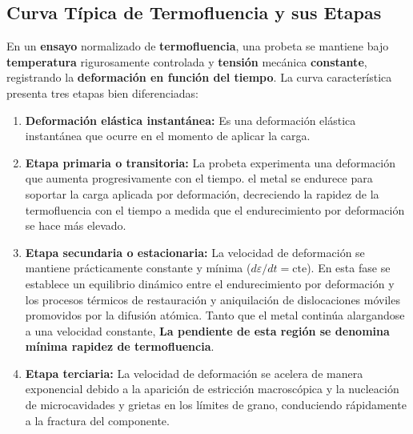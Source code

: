 \subsection{Curva Típica de Termofluencia y sus Etapas}
En un \textbf{ensayo} normalizado de \textbf{termofluencia}, una probeta se mantiene bajo \textbf{temperatura} rigurosamente controlada y \textbf{tensión} mecánica \textbf{constante}, registrando la \textbf{deformación en función del tiempo}. La curva característica presenta tres etapas bien diferenciadas:
\begin{enumerate}
    \item \textbf{Deformación elástica instantánea:} Es una deformación elástica instantánea que ocurre en el momento de aplicar la carga.
    \item \textbf{Etapa primaria o transitoria:} La probeta experimenta una deformación que aumenta progresivamente con el tiempo. el metal se endurece para soportar la carga aplicada por deformación, decreciendo la rapidez de la termofluencia con el tiempo a medida que el endurecimiento por deformación se hace más elevado.
    \item \textbf{Etapa secundaria o estacionaria:} La velocidad de deformación se mantiene prácticamente constante y mínima ($d\varepsilon/dt = \text{cte}$). En esta fase se establece un equilibrio dinámico entre el endurecimiento por deformación y los procesos térmicos de restauración y aniquilación de dislocaciones móviles promovidos por la difusión atómica. Tanto que el metal continúa alargandose a una velocidad constante, \textbf{La pendiente de esta región se denomina mínima rapidez de termofluencia}.
    \item \textbf{Etapa terciaria:} La velocidad de deformación se acelera de manera exponencial debido a la aparición de estricción macroscópica y la nucleación de microcavidades y grietas en los límites de grano, conduciendo rápidamente a la fractura del componente.
\end{enumerate}

